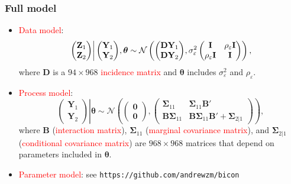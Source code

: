 \documentclass{beamer}
\newcommand{\Bmat} {\textbf{B}}
\newcommand{\Dmat} {\textbf{D}}
\newcommand{\Imat} {\textbf{I}}
\newcommand{\Yvec}{\mathbf{Y}}
\newcommand{\Zvec}{\mathbf{Z}}
\newcommand{\thetab}{\boldsymbol{\theta}}
\newcommand{\bzero}{\boldsymbol{0}}
\newcommand{\bSigma}{\bm{\Sigma}}
\begin{document}

\begin{frame}
\frametitle{Full model}

\begin{itemize}
\item \textcolor{red}{Data model}:
\begin{align*}
\left.\begin{pmatrix} \Zvec_1 \\ \Zvec_2 \end{pmatrix}
\right|
\begin{pmatrix} \Yvec_1 \\ \Yvec_2 \end{pmatrix} \hspace{-0.02in} ,\thetab
\sim
\mathcal{N}\left(
\begin{pmatrix} \Dmat\Yvec_1 \\ \Dmat\Yvec_2 \end{pmatrix}  \hspace{-0.02in}, \sigma^2_\varepsilon\begin{pmatrix} \Imat & \rho_\varepsilon\Imat \\ \rho_\varepsilon\Imat & \Imat \end{pmatrix}
\right),
\end{align*}
where $\Dmat$ is a $94\times 968$ \textcolor{red}{incidence matrix} and $\thetab$ includes $\sigma^2_\varepsilon$ and $\rho_\varepsilon$.
\item \textcolor{red}{Process model}:
\begin{equation*}
\left.\begin{pmatrix} \Yvec_1 \\ \Yvec_2 \end{pmatrix}\right| \thetab \sim \mathcal{N}
\left(
\begin{pmatrix} \bzero \\ \bzero \end{pmatrix},
\begin{pmatrix}
\bSigma_{11} & \bSigma_{11}\Bmat' \\
\Bmat \bSigma_{11} & \Bmat \bSigma_{11}\Bmat' + \bSigma_{2|1}
\end{pmatrix}
\right),
\end{equation*}
\noindent where $\mathbf{B}$ (\textcolor{red}{interaction matrix}), $\bSigma_{11}$ (\textcolor{red}{marginal covariance matrix}), and $\bSigma_{2|1}$ (\textcolor{red}{conditional covariance matrix}) are $968\times 968$ matrices that depend on parameters included in $\thetab$.
\item \textcolor{red}{Parameter model}: see \texttt{https://github.com/andrewzm/bicon}
\end{itemize}
\end{frame}
\end{document}
